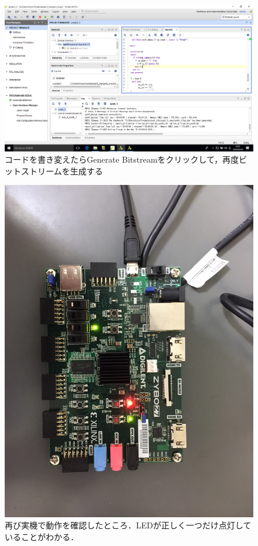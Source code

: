 \documentclass[a4paper,dvipdfmx]{jsarticle}
\begin{document}
 \begin{figure}[H]
  \begin{center}
   \includegraphics[width=.8\textwidth]{chapter08_figures/VirtualBox_Windows10_20_03_2018_00_32_36.png}
  \end{center}
  \caption{コードを書き変えたらGenerate Bitstreamをクリックして，再度ビットストリームを生成する}
 \end{figure}

 \begin{figure}[H]
  \begin{center}
   \includegraphics[width=.8\textwidth]{chapter08_figures/IMG_0015.JPG}
  \end{center}
  \caption{再び実機で動作を確認したところ．LEDが正しく一つだけ点灯していることがわかる．}
 \end{figure}
\end{document}

